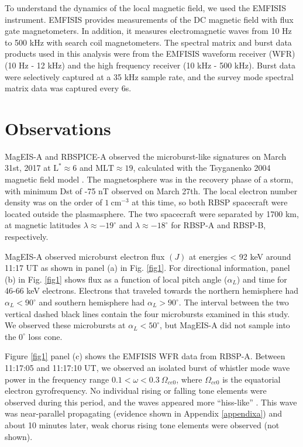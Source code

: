 To understand the dynamics of the local magnetic field, we used the EMFISIS instrument. EMFISIS provides measurements of the DC magnetic field with flux gate magnetometers. In addition, it measures electromagnetic waves from 10 Hz to 500 kHz with search coil magnetometers. The spectral matrix and burst data products used in this analysis were from the EMFISIS waveform receiver (WFR) (10 Hz - 12 kHz) and the high frequency receiver (10 kHz - 500 kHz). Burst data were selectively captured at a 35 kHz sample rate, and the survey mode spectral matrix data was captured every 6s.

\section{Observations} \label{obs}
MagEIS-A and RBSPICE-A observed the microburst-like signatures on March 31st, 2017 at $\mathrm{L}^* \approx 6$ and $\mathrm{MLT} \approx 19$, calculated with the Tsyganenko 2004 magnetic field model \citep{Tsyganenko2005}. The magnetosphere was in the recovery phase of a storm, with minimum Dst of -75 nT observed on March 27th. The local electron number density was on the order of $1 \ \mathrm{cm}^{-3}$ at this time, so both RBSP spacecraft were located outside the plasmasphere. The two spacecraft were separated by 1700 km, at magnetic latitudes $\lambda {\approx} -19^\circ$ and $\lambda {\approx} -18^\circ$ for RBSP-A and RBSP-B, respectively.

MagEIS-A observed microburst electron flux $(J)$ at energies < 92 keV around 11:17 UT as shown in panel (a) in Fig. \ref{fig1}. For directional information, panel (b) in Fig. \ref{fig1} shows flux as a function of local pitch angle ($\alpha_{L}$) and time for 46-66 keV electrons. Electrons that traveled towards the northern hemisphere had $\alpha_{L} < 90^\circ$ and southern hemisphere had $\alpha_{L} > 90^\circ$. The interval between the two vertical dashed black lines contain the four microbursts examined in this study. We observed these microbursts at $\alpha_{L} < 50^\circ$, but MagEIS-A did not sample into the $0^\circ$ loss cone.

Figure \ref{fig1} panel (c) shows the EMFISIS WFR data from RBSP-A. Between 11:17:05 and 11:17:10 UT, we observed an isolated burst of whistler mode wave power in the frequency range $0.1 < \omega < 0.3 \ \Omega_{ce0}$, where $\Omega_{ce0}$ is the equatorial electron gyrofrequency. No individual rising or falling tone elements were observed during this period, and the waves appeared more ``hiss-like'' \citep[e.g.][]{Li2012}. This wave was near-parallel propagating (evidence shown in Appendix \ref{appendixa}) and about 10 minutes later, weak chorus rising tone elements were observed (not shown).

